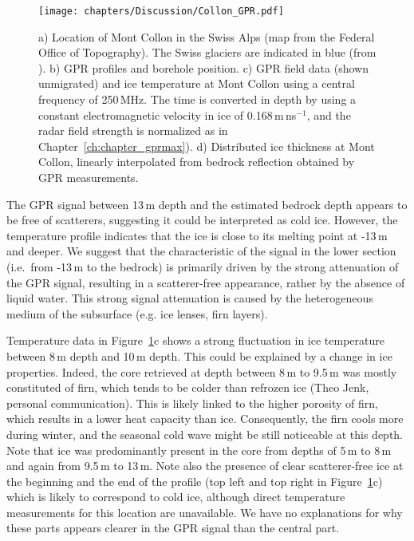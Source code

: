 \begin{figure}[H]
    \centering
    \texttt{[image: chapters/Discussion/Collon\_GPR.pdf]}
    \caption{a) Location of Mont Collon in the Swiss Alps (map from the Federal Office of Topography). The Swiss glaciers are indicated in blue (from \cite{Linsbauer&al2021}). b) GPR profiles and borehole position. c) GPR field data (shown unmigrated) and ice temperature at Mont Collon using a central frequency of 250\,MHz. The time is converted in depth by using a constant electromagnetic velocity in ice of 0.168\,m\,ns$^{-1}$, and the radar field strength is normalized as in Chapter~\ref{ch:chapter_gprmax}). d) Distributed ice thickness at Mont Collon, linearly interpolated from bedrock reflection obtained by GPR measurements.}
    \label{fig:collon_GPR}
\end{figure}


The GPR signal between 13\,m depth and the estimated bedrock depth appears to be free of scatterers, suggesting it could be interpreted as cold ice. However, the temperature profile indicates that the ice is close to its melting point at -13\,m and deeper. We suggest that the characteristic of the signal in the lower section (i.e.\ from -13\,m to the bedrock) is primarily driven by the strong attenuation of the GPR signal, resulting in a scatterer-free appearance, rather by the absence of liquid water. This strong signal attenuation is caused by the heterogeneous medium of the subsurface (e.g. ice lenses, firn layers). 

Temperature data in Figure~\ref{fig:collon_GPR}c shows a strong fluctuation in ice temperature between 8\,m depth and 10\,m depth. This could be explained by a change in ice properties. Indeed, the core retrieved at depth between 8\,m to 9.5\,m was mostly constituted of firn, which tends to be colder than refrozen ice (Theo Jenk, personal communication). This is likely linked to the higher porosity of firn, which results in a lower heat capacity than ice. Consequently, the firn cools more during winter, and the seasonal cold wave might be still noticeable at this depth. Note that ice was predominantly present in the core from depths of 5\,m to 8\,m and again from 9.5\,m to 13\,m. Note also the presence of clear scatterer-free ice at the beginning and the end of the profile (top left and top right in Figure~\ref{fig:collon_GPR}c) which is likely to correspond to cold ice, although direct temperature measurements for this location are unavailable. We have no explanations for why these parts appears clearer in the GPR signal than the central part. 
%

